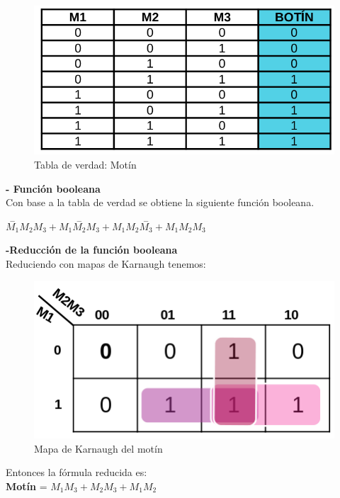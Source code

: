 \documentclass[11pt,letterpaper]{article}
\begin{document}
\begin{itemize}
			\begin{figure}[h]
				\centering
				\includegraphics[scale=0.45]{Motin.png}
				\caption{Tabla de verdad: Motín}
			\end{figure}
		
		\newpage
		\subitem \textbf{- Función booleana}\\		
		\hspace*{0.85cm} Con base a la tabla de verdad se obtiene la siguiente función booleana.
		
		\hspace*{3.5cm} $\overset{-}{M_{1}}M_{2}M_{3} + M_{1}\overset{-}{M_{2}}M_{3} + M_{1}M_{2}\overset{-}{M_{3}} + M_{1}M_{2}M_{3}$
		
		\subitem \textbf{-Reducción de la función booleana}\\
		\hspace*{0.85cm}Reduciendo con mapas de Karnaugh tenemos:
		
		\begin{figure}[h]
			\centering
			\includegraphics[scale=0.5]{Karnaugh.png}
			\caption{Mapa de Karnaugh del motín}
		\end{figure}
	
		\hspace*{0.85cm} Entonces la fórmula reducida es:\\
		\hspace*{0.85cm} \textbf{Motín} = $M_{1}M_{3} + M_{2}M_{3} + M_{1}M_{2}$
		

\end{itemize}
\end{document}
